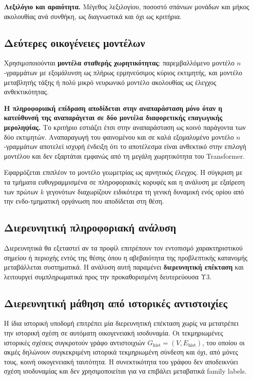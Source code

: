 \documentclass[11pt,a4paper]{article}
\begin{document}
\textbf{Λεξιλόγιο και αραιότητα.} Μέγεθος λεξιλογίου, ποσοστό σπάνιων μονάδων και μήκος ακολουθίας ανά συνθήκη, ως διαγνωστικά και όχι ως κριτήρια.

\subsection{Δεύτερες οικογένειες μοντέλων}\label{app:robust-models}

Χρησιμοποιούνται \textbf{μοντέλα σταθερής χωρητικότητας}: παρεμβαλλόμενο μοντέλο \(n\)-γραμμάτων με εξομάλυνση ως πλήρως ερμηνεύσιμος κύριος εκτιμητής, και μοντέλο μεταβλητής τάξης ή πολύ μικρό νευρωνικό μοντέλο ακολουθίας ως έλεγχος ανθεκτικότητας.

\textbf{Η πληροφοριακή επίδραση αποδίδεται στην αναπαράσταση μόνο όταν η κατεύθυνσή της αναπαράγεται σε δύο μοντέλα διαφορετικής επαγωγικής μεροληψίας.} Το κριτήριο εστιάζει έτσι στην αναπαράσταση ως κοινό παράγοντα των δύο εκτιμητών. Αναπαραγωγή του φαινομένου και σε καλά εξομαλυμένο μοντέλο \(n\)-γραμμάτων αποτελεί ισχυρή ένδειξη ότι το αποτέλεσμα είναι ανθεκτικό στην επιλογή μοντέλου και δεν εξαρτάται εμφανώς από τη μεγάλη χωρητικότητα του Transformer.

Εφαρμόζεται επιπλέον το μοντέλο γεωμετρίας ως αρνητικός έλεγχος. Η σύγκριση με τα τμήματα ευθυγραμμισμένα σε πληροφοριακές κορυφές και η ανάλυση με εξαίρεση των πρώτων \(k\) γεγονότων διαχωρίζουν ειδικότερα τη γενική δυναμική ενός ορίου από την ενδο-τμηματική οργάνωση που αποδίδεται στη θέση.

\subsection{Διερευνητική πληροφοριακή ανάλυση}\label{app:robust-info}

Διερευνητικά θα εξεταστεί αν τα προφίλ επιτρέπουν τον εντοπισμό χαρακτηριστικού σημείου ή περιοχής εντός της θέσης όπου η αβεβαιότητα της προβλεπτικής κατανομής μεταβάλλεται συστηματικά. Η ανάλυση αυτή παραμένει \textbf{διερευνητική επέκταση} και λειτουργεί συμπληρωματικά προς την προκαθορισμένη δευτερεύουσα Υ3.

\subsection{Διερευνητική μάθηση από ιστορικές αντιστοιχίες}\label{app:robust-reverse}

Η ίδια ιστορική υποδομή επιτρέπει μία διερευνητική επέκταση χωρίς να μετατρέπει την ιστορική σχέση σε αυτόματη οικογενειακή ισοδυναμία. Οι τεκμηριωμένες ιστορικές σχέσεις συγκροτούν γράφο αντιστοιχιών $G_{\mathrm{hist}}=(V,E_{\mathrm{hist}})$, του οποίου οι ακμές δηλώνουν συγκεκριμένη ιστορικά τεκμηριωμένη σύνδεση και όχι, από μόνες τους, κοινή οικογενειακή ταυτότητα. Η συνεκτικότητα του γράφου δεν αποδεικνύει σχέση ισοδυναμίας και δεν χρησιμοποιείται για να επιβάλει μεταβατικά family labels.
\end{document}
